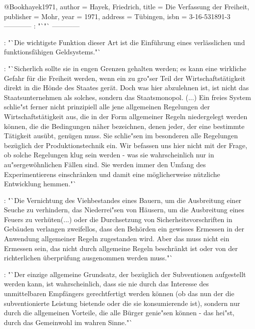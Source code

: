 \documentclass[
    onecolumn,
    a4paper,
    abstracton,
    parskip=half
    ,final
    ]{scrartcl}
\begin{document}
@Book{hayek1971,
 author = {Hayek, Friedrich},
 title = {Die Verfassung der Freiheit},
 publisher = {Mohr},
 year = {1971},
 address = {Tübingen},
 isbn = {3-16-531891-3}
 }
 ------------
\citep[vgl.][S.]{hayek1971die}: "`"`
------------

\citep[vgl.][S.288]{hayek1971die}: "`Die wichtigste Funktion dieser Art ist die Einf{\"u}hrung eines verl{\"a}sslichen und funktionsf{\"a}higen Geldsystems."`

\citep[vgl.][S.290]{hayek1971die}: "`Sicherlich sollte sie in engen Grenzen gehalten werden; es kann eine wirkliche Gefahr f{\"u}r die Freiheit werden, wenn ein zu gro{"s}er Teil der Wirtschaftst{\"a}tigkeit direkt in die H{\"o}nde des Staates ger{\"a}t. Doch was hier abzulehnen ist, ist nicht das Staatsunternehmen als solches, sondern das Staatsmonopol.
(...) Ein freies System schlie{"s}t ferner nicht prinzipiell alle jene allgemeinen Regelungen der Wirtschaftst{\"a}tigkeit aus, die in der Form allgemeiner Regeln niedergelegt werden k{\"o}nnen, die die Bedingungen n{\"a}her bezeichnen, denen jeder, der eine bestimmte T{\"a}tigkeit aus{\"u}bt, gen{\"u}gen muss. Sie schlie{"s}en im besonderen alle Regelungen bez{\"u}glich der Produktionstechnik ein. Wir befassen uns hier nicht mit der Frage, ob solche Regelungen klug sein werden -  was sie wahrscheinlich nur in au{"s}ergew{\"o}hnlichen F{\"a}llen sind. Sie werden immer den Umfang des Experimentierens einschr{\"a}nken und damit eine m{\"o}glicherweise n{\"u}tzliche Entwicklung hemmen."`

\citep[vgl.][S.291]{hayek1971die}: "`Die Vernichtung des Viehbestandes eines Bauern, um die Ausbreitung einer Seuche zu verhindern, das Niederrei{"s}en von H{\"a}usern, um die Ausbreitung eines Feuers zu verh{\"u}ten(...) oder die Durchsetzung von Sicherheitsvorschriften in Geb{\"a}uden verlangen zweifellos, dass den Beh{\"o}rden ein gewisses Ermessen in der Anwendung allgemeiner Regeln zugestanden wird. Aber das muss nicht ein Ermessen sein, das nicht durch allgemeine Regeln beschr{\"a}nkt ist oder von der richterlichen {\"u}berpr{\"u}fung ausgenommen werden muss."`

\citep[vgl.][S.336]{hayek1971die}: "`Der einzige allgemeine Grundsatz, der bez{\"u}glich der Subventionen aufgestellt werden kann, ist wahrscheinlich, dass sie nie durch das Interesse des unmittelbaren Empf{\"a}ngers gerechtfertigt werden k{\"o}nnen (ob das nun der die subventionierte Leistung bietende oder die sie konsumierende ist), sondern nur durch die allgemeinen Vorteile, die alle B{\"u}rger genie{"s}en k{\"o}nnen -  das hei{"s}t, durch das Gemeinwohl im wahren Sinne."`
\end{document}
